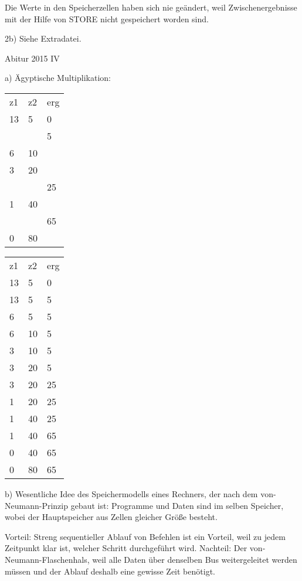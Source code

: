 \documentclass{lehramt-informatik-aufgabe}
\begin{document}
Die Werte in den Speicherzellen haben sich nie geändert, weil Zwischenergebnisse mit der Hilfe von STORE nicht gespeichert worden sind.

%

2b) Siehe Extradatei.

Abitur 2015 IV

%

a) Ägyptische Multiplikation:

\begin{tabular}{lll}
z1 & z2 & erg \\
13 & 5  & 0   \\
   &    & 5   \\
6  & 10 &     \\
3  & 20 &     \\
   &    & 25  \\
1  & 40 &     \\
   &    & 65  \\
0  & 80 &
\end{tabular}

\begin{tabular}{lll}
z1 & z2 & erg \\
13 & 5  & 0   \\
13 & 5  & 5   \\
6  & 5  & 5   \\
6  & 10 & 5   \\
3  & 10 & 5   \\
3  & 20 & 5   \\
3  & 20 & 25  \\
1  & 20 & 25  \\
1  & 40 & 25  \\
1  & 40 & 65  \\
0  & 40 & 65  \\
0  & 80 & 65
\end{tabular}

%

b)
Wesentliche Idee des Speichermodells eines Rechners, der nach dem von-Neumann-Prinzip gebaut ist:
Programme und Daten sind im selben Speicher, wobei der Hauptspeicher aus Zellen gleicher Größe besteht.

Vorteil:
Streng sequentieller Ablauf von Befehlen ist ein Vorteil, weil zu jedem Zeitpunkt klar ist, welcher Schritt durchgeführt wird.
Nachteil: Der von-Neumann-Flaschenhals, weil alle Daten über denselben Bus weitergeleitet werden müssen und der Ablauf deshalb eine gewisse Zeit benötigt.

%
\end{document}
